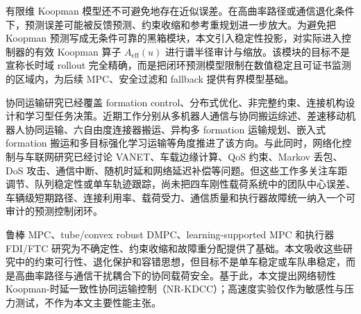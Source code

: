 \documentclass[twocolumn,3p,times,procedia]{elsarticle}
\newcommand{\Method}{NR-KDCC}
\begin{document}
有限维 Koopman 模型还不可避免地存在近似误差。在高曲率路径或通信退化条件下，预测误差可能被反馈预测、约束收缩和参考重规划进一步放大。为避免把 Koopman 预测写成无条件可靠的黑箱模块，本文引入稳定性投影，对实际进入控制器的有效 Koopman 算子 $A_{\mathrm{eff}}(u)$ 进行谱半径审计与缩放。该模块的目标不是宣称长时域 rollout 完全精确，而是把闭环预测模型限制在数值稳定且可证书监测的区域内，为后续 MPC、安全过滤和 fallback 提供有界模型基础。

协同运输研究已经覆盖 formation control、分布式优化、非完整约束、连接机构设计和学习型任务决策。近期工作分别从多机器人通信与协同搬运综述、差速移动机器人协同运输、六自由度连接器搬运、异构多 formation 运输规划、嵌入式 formation 搬运和多目标强化学习运输等角度推进了该方向\cite{an2023multiRobotCommTransport,cooperativeTransport2024ras,gong2023sixDofTransport,zhang2024heterogeneousTransport,embeddedFormationTransport2024cep,multiObjectiveTransport2024mechatronics,intelligentCollaborativeTransport2024}。与此同时，网络化控制与车联网研究已经讨论 VANET、车载边缘计算、QoS 约束、Markov 丢包、DoS 攻击、通信中断、随机时延和网络延迟补偿等问题\cite{tan2022mlVehicularDcn,zhao2025blockchainVanetDcn,wu2025drlVecDcn,bian2025markovPacketLossDMPC,dosDMPC2024isa,robustCommunicationLoss2025trb,bai2023robustLongitudinalDMPC,bao2024robustUkfMpc,networkLatencyCav2024sensors,dai2024networkedPredictiveControl}。但这些工作多关注车距调节、队列稳定性或单车轨迹跟踪，尚未把四车刚性载荷系统中的团队中心误差、车辆级短期路径、连接利用率、载荷受力、通信质量和执行器故障统一纳入一个可审计的预测控制闭环。

鲁棒 MPC、tube/convex robust DMPC、learning-supported MPC 和执行器 FDI/FTC 研究为不确定性、约束收缩和故障重分配提供了基础\cite{mayne2000constrainedMpc,mayne2005robustMpc,convexRobustDMPC2025ejc,gasparino2023nnMpcUncertainty,liu2024adaptiveFtcSbw,xu2024fdFtcSteering}。本文吸收这些研究中的约束可行性、退化保护和容错思想，但目标不是单车稳定或车队串稳定，而是高曲率路径与通信干扰耦合下的协同载荷安全。基于此，本文提出网络韧性 Koopman-时延一致性协同运输控制（\Method{}）；高速度实验仅作为敏感性与压力测试，不作为本文主要性能主张。
\end{document}
